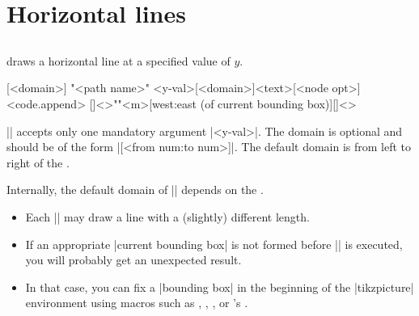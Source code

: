 \begin{tzcode}{.3}
\end{tzcode}









\section{Horizontal lines}
\label{s:tzhfn}

\subsection{\protect\cmd{\tzhfnat}}
\label{ss:tzhfnat}

\icmd{\tzhfnat} draws a horizontal line at a specified value of $y$.


\begin{tzdef}
[<domain>]
"<path name>"
        {<y-val>}[<domain>]{<text>}[<node opt>]<code.append>
  []<>""{<m>}[west:east (of current bounding box)]{}[]<>
\end{tzdef}


|\tzhfnat| accepts only one mandatory argument |{<y-val>}|.
The domain is optional and should be of the form |[<from num:to num>]|.
The default domain is from left to right of the .

\remark Internally, the default domain of |\tzhfnat| depends on the .
\begin{itemize}
\item Each |\tzhfnat| may draw a line with a (slightly) different length.
\item If an appropriate |current bounding box| is not formed before |\tzhfnat| is executed, you will probably get an unexpected result.
\item In that case, you can fix a |bounding box| in the beginning of the |tikzpicture| environment using macros such as \icmd{\tzbbox}, \icmd{\tzhelplines*}, \icmd{\tzaxes*}, or \Tikz's \icmd{\useasboundingbox}.
\end{itemize}


